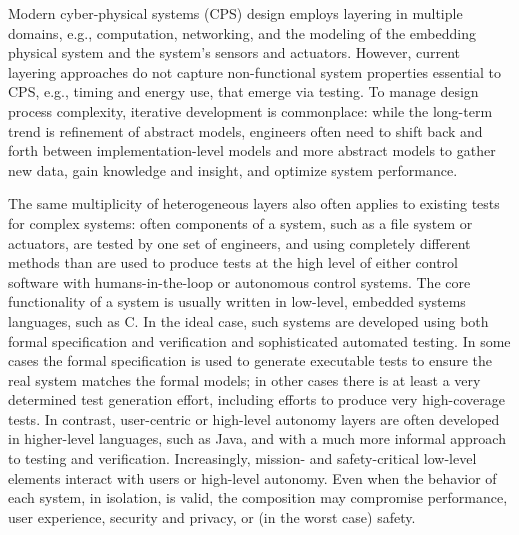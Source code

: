 

Modern cyber-physical systems (CPS) design employs layering in multiple domains, e.g., computation, networking, and the modeling of the embedding physical system and the system's sensors and actuators. However, current layering approaches do not capture non-functional system properties essential to CPS, e.g., timing and energy use, that emerge via testing.  To manage design process complexity, iterative development is commonplace: while the long-term trend is refinement of abstract models, engineers often need to shift back and forth between implementation-level models and more abstract models to gather new data, gain knowledge and insight, and optimize system performance.

The same multiplicity of heterogeneous layers also often applies to existing tests for complex systems: often components of a system, such as a file system or actuators, are tested by one set of engineers, and using completely different methods than are used to produce tests at the high level of either control software with humans-in-the-loop or autonomous control systems.  The core functionality of a system is usually written in low-level, embedded systems languages, such as C.  In the ideal case, such systems are developed using both formal specification and verification and sophisticated automated testing.  In some cases the formal specification is used to generate executable tests to ensure the real system matches the formal models; in other cases there is at least a very determined test generation effort, including efforts to produce very high-coverage tests.  In contrast, user-centric or high-level autonomy layers are often developed in higher-level languages, such as Java, and with a much more informal approach to testing and verification.  Increasingly, mission- and safety-critical low-level elements interact with users or high-level autonomy.  Even when the behavior of each system, in isolation, is valid, the composition may compromise performance, user experience, security and privacy, or (in the worst case) safety.

